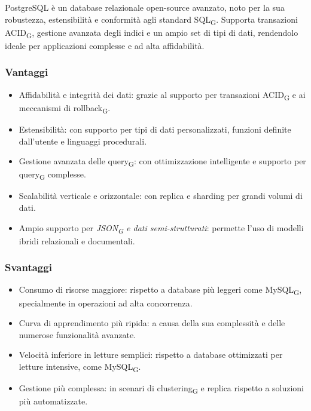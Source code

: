 PostgreSQL è un database relazionale open-source avanzato, noto per la sua robustezza, estensibilità e conformità agli standard SQL\textsubscript{G}. Supporta transazioni ACID\textsubscript{G}, gestione avanzata degli indici e un ampio set di tipi di dati, rendendolo ideale per applicazioni complesse e ad alta affidabilità.  

\subsubsection{Vantaggi} 
\begin{itemize}  
    \item Affidabilità e integrità dei dati: grazie al supporto per transazioni ACID\textsubscript{G} e ai meccanismi di rollback\textsubscript{G}.  
    \item Estensibilità: con supporto per tipi di dati personalizzati, funzioni definite dall’utente e linguaggi procedurali.  
    \item Gestione avanzata delle query\textsubscript{G}: con ottimizzazione intelligente e supporto per query\textsubscript{G} complesse.  
    \item Scalabilità verticale e orizzontale: con replica e sharding per grandi volumi di dati.  
    \item Ampio supporto per \textit{JSON\textsubscript{G} e dati semi-strutturati}: permette l’uso di modelli ibridi relazionali e documentali.  
\end{itemize}  

\subsubsection{Svantaggi}  
\begin{itemize}  
    \item Consumo di risorse maggiore: rispetto a database più leggeri come MySQL\textsubscript{G}, specialmente in operazioni ad alta concorrenza.  
    \item Curva di apprendimento più ripida: a causa della sua complessità e delle numerose funzionalità avanzate.  
    \item Velocità inferiore in letture semplici: rispetto a database ottimizzati per letture intensive, come MySQL\textsubscript{G}.  
    \item Gestione più complessa: in scenari di clustering\textsubscript{G} e replica rispetto a soluzioni più automatizzate.  
\end{itemize} 

